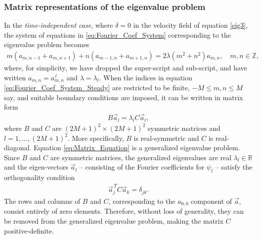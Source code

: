\documentclass{article}
\newcommand{\0}{\mathbf{0}}
\newcommand{\1}{\mathbf{1}}
\newcommand{\2}{\mathbf{2}}
\newcommand{\3}{\mathbf{3}}
\newcommand{\4}{\mathbf{4}}
\newcommand{\5}{\mathbf{5}}
\newcommand{\6}{\mathbf{6}}
\newcommand{\7}{\mathbf{7}}
\newcommand{\8}{\mathbf{8}}
\begin{document}
\subsubsection{Matrix representations of the eigenvalue problem}
%
In the \emph{time-independent case}, where $\delta=0$ in the velocity field
of equation \eqref{eig3}, the system of equations in
\eqref{eq:Fourier_Coef_System} corresponding to the eigenvalue problem
becomes 
%
\begin{align}\label{eq:Fourier_Coef_System_Steady}
  m(a_{m,n-1}+a_{m,n+1})+n(a_{m-1,n}+a_{m+1,n})=2\lambda(m^2+n^2)a_{m,n},
  \quad m,n\in\mathbb{Z},
\end{align}
%
where, for simplicity, we have dropped the super-script and
sub-script, and have written $a_{m,n}=a^{\,l}_{m,n}$ and
$\lambda=\lambda_l$. When the indices in equation
\eqref{eq:Fourier_Coef_System_Steady} are restricted to be finite,
$-M\leq m,n\leq M$ say, and suitable boundary conditions are imposed, it can
be written in matrix form   
%
\begin{align}\label{eq:Matrix_Equation}
  B\vec{a}_l=\lambda_l C\vec{a}_l,
\end{align}
%
where $B$ and $C$ are $(2M+1)^2\times(2M+1)^2$ symmetric matrices and
$l=1,\ldots,(2M+1)^2$. More specifically, $B$ is real-symmetric and $C$ is
real-diagonal. Equation \eqref{eq:Matrix_Equation} is a generalized
eigenvalue problem. Since $B$ and $C$ are symmetric matrices, the
generalized eigenvalues are real $\lambda_l\in\mathbb{R}$ and the
eigen-vectors $\vec{a}_l$ -- consisting of the Fourier coefficients for
$\psi_l$ -- satisfy the orthogonality condition
%
\begin{align}\label{eq:Matrix_Ortho}
  \vec{a}_j^{\,T}C\vec{a}_k=\delta_{jk}.
\end{align}
%
The rows and columns of $B$ and $C$, corresponding to the $a_{0,0}$
component of $\vec{a}$, consist entirely of zero elements. Therefore,
without loss of generality, they can be removed from the generalized
eigenvalue problem, making the matrix $C$ positive-definite. 
\end{document}
